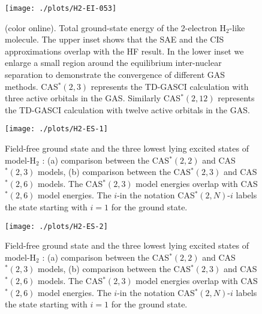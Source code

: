 \documentclass[twocolumn,aps,showpacs,superscriptaddress,longbibliography]{revtex4-1}
\begin{document}
\begin{figure}
 \texttt{[image: ./plots/H2-EI-053]}
 \caption{(color online). Total ground-state energy of the 2-electron $\mathrm{H}_2$-like molecule.
           The upper inset shows that the SAE and the CIS approximations overlap with the HF result.
           In the lower inset we enlarge a small region around the equilibrium inter-nuclear separation
           to demonstrate the convergence of different GAS methods.
           CAS$^*(2,3)$ represents the TD-GASCI calculation with three active orbitals in the GAS.
           Similarly  CAS$^*(2,12)$ represents the TD-GASCI calculation with twelve active orbitals
           in the GAS.}
 \label{fig:H2-CAS}
\end{figure}


\begin{figure}
    \texttt{[image: ./plots/H2-ES-1]}
    \caption{Field-free ground state and the three lowest lying excited states of model-$\mathrm{H}_2$ :
             (a) comparison between the CAS$^*(2,2)$ and CAS$^*(2,3)$ models,
             (b) comparison between the CAS$^*(2,3)$ and CAS$^*(2,6)$ models.
              The CAS$^*(2,3)$ model energies overlap with CAS$^*(2,6)$ model energies.
              The $i$-in the notation CAS$^*(2,N)$-$i$ labels the state starting with $i = 1$ for
              the ground state.}
     \label{fig:H2-es}
\end{figure}

\begin{figure}
    \texttt{[image: ./plots/H2-ES-2]}
    \caption{Field-free ground state and the three lowest lying excited states of model-$\mathrm{H}_2$ :
             (a) comparison between the CAS$^*(2,2)$ and CAS$^*(2,3)$ models,
             (b) comparison between the CAS$^*(2,3)$ and CAS$^*(2,6)$ models.
              The CAS$^*(2,3)$ model energies overlap with CAS$^*(2,6)$ model energies.
              The $i$-in the notation CAS$^*(2,N)$-$i$ labels the state starting with $i = 1$ for
              the ground state.}
     \label{fig:H2-es}
\end{figure}




\end{document}

